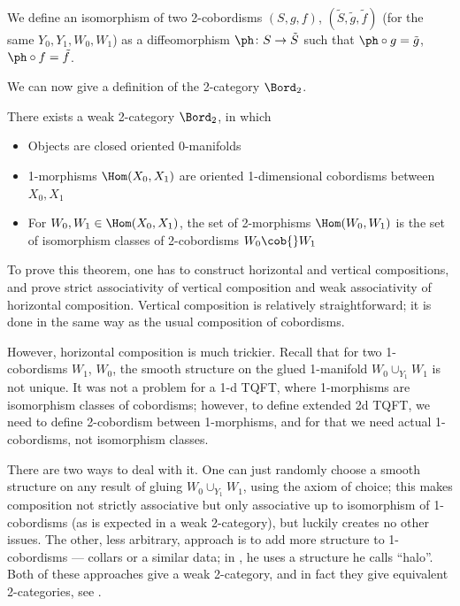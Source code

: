 We define an isomorphism of two 2-cobordisms $(S, g,f)$, $(\tilde S, \tilde
g, \tilde f)$ (for the same $Y_0,Y_1, W_0, W_1$) as a diffeomorphism $\ph\colon
S\to \tilde S$ such that $\ph\circ g = \tilde g$, $\ph\circ f=\tilde f$.

We can now give a definition of the 2-category $\Bord_2$.

\begin{theorem}\label{t:bord2}
  There exists a weak 2-category $\Bord_2$, in which
  \begin{itemize}
    \item Objects are closed oriented $0$-manifolds
    \item 1-morphisms $\Hom(X_0, X_1)$ are oriented 1-dimensional cobordisms
      between $X_0, X_1$
    \item For $W_0, W_1\in \Hom(X_0, X_1)$, the set of 2-morphisms
       $\Hom(W_0,W_1)$ is the set of isomorphism classes of 2-cobordisms
       $W_0\cob{}W_1$
  \end{itemize}
\end{theorem}
To prove this theorem, one has to construct horizontal and vertical
compositions, and prove strict associativity of vertical composition and
weak associativity of horizontal composition. Vertical composition is
relatively straightforward; it is done in the same way as the usual
composition of cobordisms.

However, horizontal composition is much trickier. Recall that for two
1-cobordisms $W_1$, $W_0$, the smooth structure on the glued 1-manifold
$W_0\cup_{Y_1} W_1$ is not unique. It was not a problem for a 1-d TQFT, where
1-morphisms are isomorphism classes of cobordisms; however, to define extended
2d TQFT, we need to define 2-cobordism between 1-morphisms, and for that we
need actual 1-cobordisms, not isomorphism classes.

There are two ways to deal with it. One can just randomly choose a smooth
structure on any result of gluing $W_0\cup_{Y_1} W_1$, using the axiom of choice;
this makes composition not strictly associative but only associative up to
isomorphism of 1-cobordisms (as is expected in a weak 2-category), but luckily
creates no other issues. The other, less arbitrary, approach is to add more
structure to 1-cobordisms --- collars or a similar data; in
\cite{schommer-pries}, he uses a structure he calls ``halo''. Both of these
approaches give a weak 2-category, and in fact they give equivalent
2-categories, see \cite[Proposition 3.40]{schommer-pries}.

